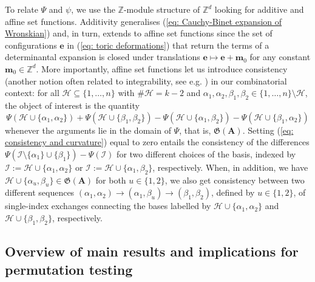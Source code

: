 \documentclass[10pt]{article}
\theoremstyle{remark}%
\theoremstyle{definition}%
\begin{document}
To relate $\Psi$ and $\psi$, we use the $\mathbb{Z}$-module structure of $\mathbb{Z}^{d}$ looking for additive and affine set functions. Additivity generalises (\ref{eq: Cauchy-Binet expansion of Wronskian}) and, in turn, extends to affine set functions since the set of configurations $\mathbf{e}$ in (\ref{eq: toric deformations}) that return the terms of a determinantal expansion is closed under translations $\mathbf{e}\mapsto \mathbf{e}+\mathbf{m}_{0}$ for any constant $\mathbf{m}_{0}\in\mathbb{Z}^{d}$. More importantly, affine set functions let us introduce consistency (another notion often related to integrability, see e.g. \citep{Bobenko2004}) in our combinatorial context: for all $\mathcal{H}\subseteq\{1,\dots,n\}$ with $\#\mathcal{H}=k-2$ and $\alpha_{1},\alpha_{2},\beta_{1},\beta_{2}\in\{1,\dots,n\}\setminus\mathcal{H}$, the object of interest is the quantity 
 \begin{equation}
\Psi\left(\mathcal{H}\cup\{\alpha_{1},\alpha_{2}\}\right)+\Psi\left(\mathcal{H}\cup\{\beta_{1},\beta_{2}\}\right)-\Psi\left(\mathcal{H}\cup\{\alpha_{1},\beta_{2}\}\right)-\Psi\left(\mathcal{H}\cup\{\beta_{1},\alpha_{2}\}\right)
\label{eq: consistency and curvature}
 \end{equation}
whenever the arguments lie in the domain of $\Psi$, that is, $\mathfrak{G}(\mathbf{A})$. Setting (\ref{eq: consistency and curvature}) equal to zero entails the consistency of the differences $\Psi(\mathcal{I}\setminus\{\alpha_{1}\}\cup\{\beta_{1}\})-\Psi(\mathcal{I})$ for two different choices of the basis, indexed by $\mathcal{I}:=\mathcal{H}\cup\{\alpha_{1},\alpha_{2}\}$ or $\mathcal{I}:=\mathcal{H}\cup\{\alpha_{1},\beta_{2}\}$, respectively. When, in addition, we have $\mathcal{H}\cup\{\alpha_{u},\beta_{u}\}\in\mathfrak{G}(\mathbf{A})$ for both $u\in\{1,2\}$, we also get consistency between two different sequences $(\alpha_{1},\alpha_{2})\rightarrow(\alpha_{1},\beta_{u})\rightarrow(\beta_{1},\beta_{2})$, defined by $u\in\{1,2\}$, of single-index exchanges connecting the bases labelled by $\mathcal{H}\cup\{\alpha_{1},\alpha_{2}\}$ and $\mathcal{H}\cup\{\beta_{1},\beta_{2}\}$, respectively.

\subsection{Overview of main results and implications for permutation testing}
\label{subsec: overview and main result}
\end{document}
